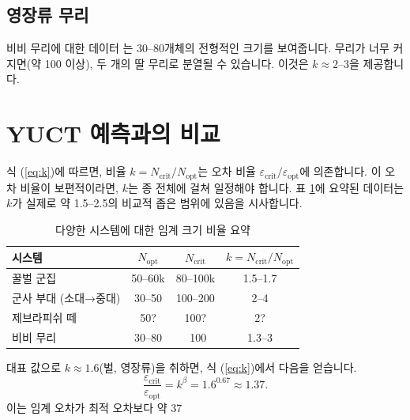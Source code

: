 \documentclass[12pt]{article}
\theoremstyle{remark}
\begin{document}
	\subsection{영장류 무리}
	\label{subsec:primates}
	
	비비 무리에 대한 데이터 \cite{Alberts1995}는 30–80개체의 전형적인 크기를 보여줍니다. 무리가 너무 커지면(약 100 이상), 두 개의 딸 무리로 분열될 수 있습니다. 이것은 \(k \approx 2\)–\(3\)을 제공합니다.
	
	\section{YUCT 예측과의 비교}
	\label{sec:comparison}
	
	식 (\ref{eq:k})에 따르면, 비율 \(k = N_{\text{crit}}/N_{\text{opt}}\)는 오차 비율 \(\varepsilon_{\text{crit}}/\varepsilon_{\text{opt}}\)에 의존합니다. 이 오차 비율이 보편적이라면, \(k\)는 종 전체에 걸쳐 일정해야 합니다. 표 \ref{tab:summary}에 요약된 데이터는 \(k\)가 실제로 약 1.5–2.5의 비교적 좁은 범위에 있음을 시사합니다.
	
	\begin{table}[htbp]
		\centering
		\caption{다양한 시스템에 대한 임계 크기 비율 요약}
		\label{tab:summary}
		\begin{tabular}{lccc}
			\toprule
			\textbf{시스템} & \(N_{\text{opt}}\) & \(N_{\text{crit}}\) & \(k = N_{\text{crit}}/N_{\text{opt}}\) \\
			\midrule
			꿀벌 군집 & 50–60k & 80–100k & 1.5–1.7 \\
			군사 부대 (소대→중대) & 30–50 & 100–200 & 2–4 \\
			제브라피쉬 떼 & 50? & 100? & 2? \\
			비비 무리 & 30–80 & ~100 & 1.3–3 \\
			\bottomrule
		\end{tabular}
	\end{table}
	
	대표 값으로 \(k \approx 1.6\)(벌, 영장류)을 취하면, 식 (\ref{eq:k})에서 다음을 얻습니다.
	\[
	\frac{\varepsilon_{\text{crit}}}{\varepsilon_{\text{opt}}} = k^{\beta} = 1.6^{0.67} \approx 1.37.
	\]
	이는 임계 오차가 최적 오차보다 약 37%
	
\end{document}
